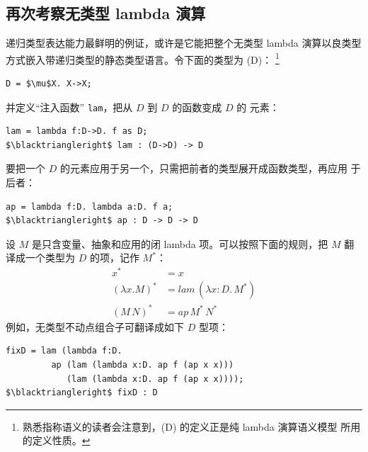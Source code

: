 \subsection*{再次考察无类型 lambda 演算}

递归类型表达能力最鲜明的例证，或许是它能把整个无类型 lambda 演算以良类型
方式嵌入带递归类型的静态类型语言。令下面的类型为 (D)：
\footnote{熟悉指称语义的读者会注意到，(D) 的定义正是纯 lambda 演算语义模型
所用的定义性质。}
\begin{lstlisting}[mathescape=true]
D = $\mu$X. X->X;
\end{lstlisting}
并定义“注入函数” \texttt{lam}，把从 \(D\) 到 \(D\) 的函数变成 \(D\) 的
元素：
\begin{lstlisting}[mathescape=true]
lam = lambda f:D->D. f as D;
$\blacktriangleright$ lam : (D->D) -> D
\end{lstlisting}
要把一个 \(D\) 的元素应用于另一个，只需把前者的类型展开成函数类型，再应用
于后者：
\begin{lstlisting}[mathescape=true]
ap = lambda f:D. lambda a:D. f a;
$\blacktriangleright$ ap : D -> D -> D
\end{lstlisting}

设 \(M\) 是只含变量、抽象和应用的闭 lambda 项。可以按照下面的规则，把
\(M\) 翻译成一个类型为 \(D\) 的项，记作 \(M^*\)：
\[
\begin{aligned}
x^* &= x\\
(\lambda x.M)^* &= \mathit{lam}\,(\lambda x:D.\,M^*)\\
(M\,N)^* &= \mathit{ap}\,M^*\,N^*
\end{aligned}
\]
例如，无类型不动点组合子可翻译成如下 \(D\) 型项：
\begin{lstlisting}[mathescape=true]
fixD = lam (lambda f:D.
         ap (lam (lambda x:D. ap f (ap x x)))
            (lam (lambda x:D. ap f (ap x x))));
$\blacktriangleright$ fixD : D
\end{lstlisting}


